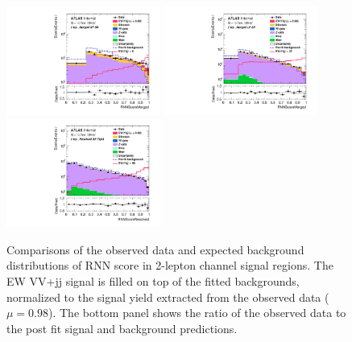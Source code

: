 \begin{figure}[]
    \centering
    \includegraphics[width=0.45\textwidth]{figures/PostFit/Region_distRNNScoreMerged_DSRVBSHP_BMin0_J0_incJet1_L2_T0_incFat1_Y6051_incTag1_Fat1_GlobalFit_unconditionnal_mu1log}
    \includegraphics[width=0.45\textwidth]{figures/PostFit/Region_distRNNScoreMerged_DSRVBSLP_BMin0_J0_incJet1_L2_T0_incFat1_Y6051_incTag1_Fat1_GlobalFit_unconditionnal_mu1log}
    \includegraphics[width=0.45\textwidth]{figures/PostFit/Region_distRNNScoreResolved_DSRVBSFid_BMin0_T0_Y6051_incTag1_J2_L2_incJet1_GlobalFit_unconditionnal_mu1log}
    \caption{Comparisons of the observed data and expected background distributions of RNN score in 2-lepton channel signal regions. The EW VV+jj signal is filled on top of the fitted backgrounds, normalized to the signal yield extracted from the observed data ($\mu = 0.98$). The bottom panel shows the ratio of the observed data to the post fit signal and background predictions.}
    \label{fig:postSR2lep}
\end{figure}


